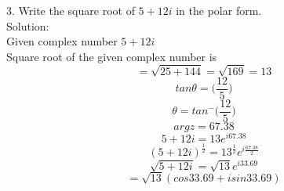 \documentclass[a4paper, 12pt]{report}
\begin{document}
{\begin{equation}
\end{equation}
3. Write the square root of $5 + 12i$ in the polar form.\\
Solution:\\
Given complex number $5 + 12i$\\
Square root of the given complex number is
\begin{equation}
= \sqrt{25 + 144} = \sqrt{169} = 13
\end{equation}
\begin{equation*}
tan\theta = \bigg(\frac{12}{5}\bigg)
\end{equation*}
\begin{equation*}
\theta =tan^- \bigg(\frac{12}{5}\bigg)
\end{equation*}
\begin{equation*}
arg z = 67.38
\end{equation*}
\begin{equation*}
5 + 12i = 13e^{i67.38}  
\end{equation*}
\begin{equation*}
(5 + 12i)^{\frac{1}{2}} = 13^{\frac{1}{2}}e^{i\frac{67.38}{2}}
\end{equation*}
\begin{equation*}
\sqrt{5 + 12i} = \sqrt{13}e^{i33.69}
\end{equation*}
\begin{equation*}
= \sqrt{13}(cos33.69 + isin33.69)
\end{equation*}
}
\end{document}
